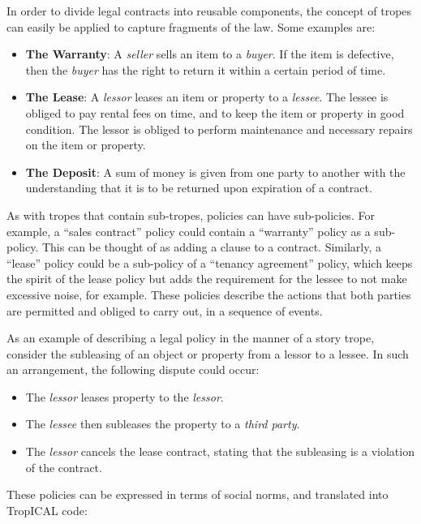 \documentclass[11pt]{report}
\begin{document}
In order to divide legal contracts into reusable components, the concept of tropes can easily be applied to capture fragments of the law. Some
examples are:

\begin{itemize}
\item \textbf{The Warranty}: A \emph{seller} sells an item to a \emph{buyer}. If
  the item is defective, then the \emph{buyer} has the right to return it within
  a certain period of time.
\item \textbf{The Lease}: A \emph{lessor} leases an item or property to a
  \emph{lessee}. The lessee is obliged to pay rental fees on time, and to keep the item
  or property in good condition. The lessor is obliged to perform maintenance
  and necessary repairs on the item or property.
\item \textbf{The Deposit}: A sum of money is given from one party to another
  with the understanding that it is to be returned upon expiration of a contract. 
\end{itemize}

As with tropes that contain sub-tropes, policies can have sub-policies. For
example, a ``sales contract'' policy could contain a ``warranty'' policy as a
sub-policy. This can be thought of as adding a clause to a contract. Similarly,
a ``lease'' policy could be a sub-policy of a ``tenancy agreement'' policy,
which keeps the spirit of the lease policy but adds the requirement for the
lessee to not make excessive noise, for example. These policies describe the
actions that both parties are permitted and obliged to carry out, in a sequence of events.

As an example of describing a legal policy in the manner of a story trope,
consider the subleasing of an object or property from a lessor to a lessee. In
such an arrangement, the following dispute could occur:

\begin{itemize}
  \item The \emph{lessor} leases property to the \emph{lessor}.
  \item The \emph{lessee} then subleases the property to a \emph{third party}.
  \item The \emph{lessor} cancels the lease contract, stating that the
    subleasing is a violation of the contract.
\end{itemize}

These policies can be expressed in terms of social norms, and translated into
TropICAL code:
\end{document}
